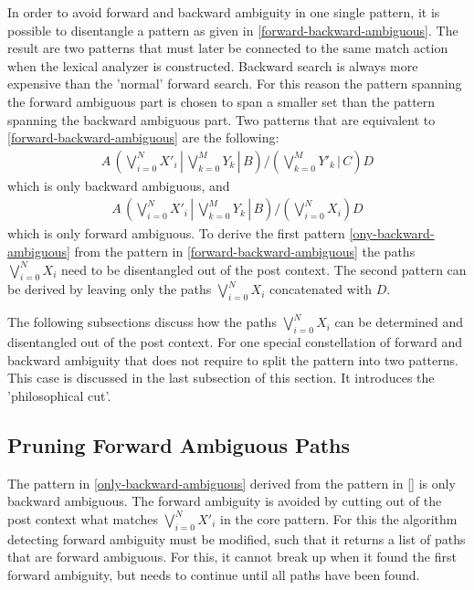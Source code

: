 In order to avoid forward and backward ambiguity in one single pattern, it is possible
to disentangle a pattern as given in \eqref{forward-backward-ambiguous}. The result
are two patterns that must later be connected to the same match action when the lexical
analyzer is constructed. Backward search is always more expensive than the 'normal' forward
search. For this reason the pattern spanning the forward ambiguous part is chosen 
to span a smaller set than the pattern spanning the backward ambiguous part.  
Two patterns that are equivalent to \eqref{forward-backward-ambiguous} are the
following:
\begin{eqnarray} \label{eq:only-backward-ambiguous}
A\,\left (       \bigvee_{i=0}^{N} X'_i 
           \,|\, \bigvee_{k=0}^{M} Y_k 
           \,|\, B 
   \right ) / 
   \left (       
           \bigvee_{k=0}^{M} Y'_k \,|\, C 
   \right ) D 
\end{eqnarray}
which is only backward ambiguous, and
\begin{eqnarray} \label{eq:only-forward-ambiguous}
A\,\left (       \bigvee_{i=0}^{N} X'_i 
           \,|\, \bigvee_{k=0}^{M} Y_k 
           \,|\, B 
   \right ) / 
   \left (       \bigvee_{i=0}^{N} X_i 
   \right ) D 
\end{eqnarray}
which is only forward ambiguous. To derive the first pattern
\eqref{ony-backward-ambiguous} from the pattern in
\eqref{forward-backward-ambiguous} the paths $\bigvee_{i=0}^{N} X_i$ need to be
disentangled out of the post context. The second pattern can be derived by
leaving only the paths $\bigvee_{i=0}^{N} X_i$ concatenated with $D$.

The following subsections discuss how the paths $\bigvee_{i=0}^{N} X_i$
can be determined and disentangled out of the post context. For one
special constellation of forward and backward ambiguity that does not
require to split the pattern into two patterns. This case is discussed
in the last subsection of this section. It introduces the 'philosophical cut'.

\subsection{Pruning Forward Ambiguous Paths}

The pattern in \eqref{only-backward-ambiguous} derived from the pattern in
\eqref{} is only backward ambiguous. The forward ambiguity is avoided by 
cutting out of the post context what matches  $\bigvee_{i=0}^{N} X'_i$ in
the core pattern. For this the algorithm detecting forward ambiguity 
 must be modified, such that it 
returns a list of paths that are forward ambiguous. For this, it cannot 
break up when it found the first forward ambiguity, but needs to continue
until all paths have been found.

